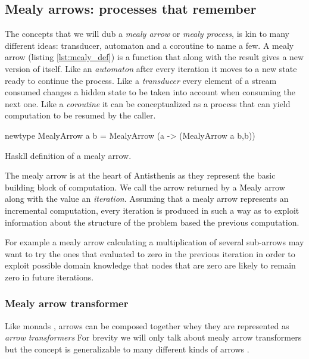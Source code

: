 \subsection{Mealy arrows:  processes that remember}
\label{sec:mealy_arrows}

The concepts that we will dub a \emph{mealy arrow} or \emph{mealy process}, is
kin to many different ideas: transducer, automaton and a coroutine to
name a few. A mealy arrow (listing \ref{lst:mealy_def}) is a function that
along with the result gives a new version of itself. Like an
\emph{automaton} after every iteration it moves to a new state ready to
continue the process. Like a \emph{transducer} every element of a stream
consumed changes a hidden state to be taken into account when
consuming the next one. Like a \emph{coroutine} it can be conceptualized as
a process that can yield computation to be resumed by the caller.

\begin{code}
\begin{haskellcode}
newtype MealyArrow a b =
  MealyArrow (a -> (MealyArrow a b,b))
\end{haskellcode}
\label{lst:mealy_def}
\caption{Haskll definition of a mealy arrow.}
\end{code}

The mealy arrow is at the heart of Antisthenis as they represent the
basic building block of computation. We call the arrow returned by a
Mealy arrow along with the value an \emph{iteration}. Assuming that a
mealy arrow represents an incremental computation, every iteration is
produced in such a way as to exploit information about the structure
of the problem based the previous computation.

For example a mealy arrow calculating a multiplication of several
sub-arrows may want to try the ones that evaluated to zero in the
previous iteration in order to exploit possible domain knowledge that
nodes that are zero are likely to remain zero in future iterations.

\subsubsection{Mealy arrow transformer}

Like monads \cite{liangMonadTransformersModular1995} , arrows can be
composed together whey they are represented as \emph{arrow transformers}
For brevity we will only talk about mealy arrow transformers but the
concept is generalizable to many different kinds of arrows
\cite{keidelSoundReusableComponents2019a}.

